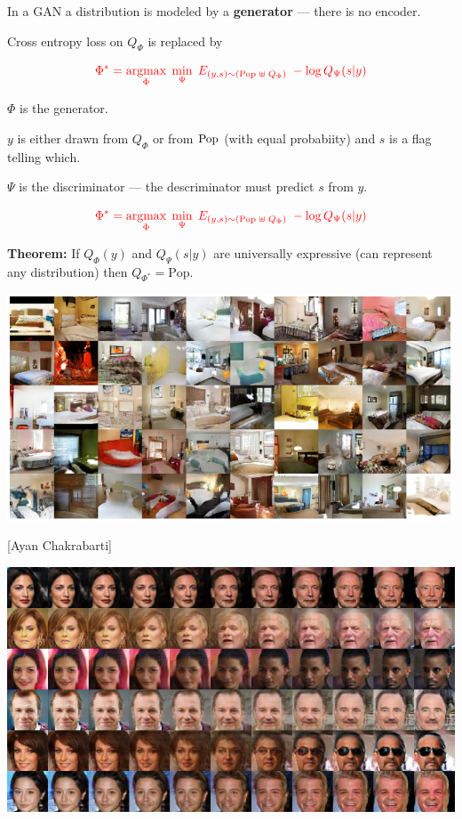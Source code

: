 {\bigskip
In a GAN a distribution is modeled by a {\bf generator} --- there is no encoder.


Cross entropy loss on $Q_\Phi$ is replaced by

$${\color{red} \Phi^* = \operatorname*{argmax}_\Phi \; \min_\Psi \;E_{(y,s) \sim (\mathrm{Pop}\; \uplus \;Q_\Phi)}\;-\log Q_\Psi(s|y)}$$

\vfill
$\Phi$ is the generator.

\vfill
$y$ is either drawn from $Q_\Phi$ or from $\mathrm{Pop}$ (with equal probabiity) and $s$ is a flag telling which.

\vfill
$\Psi$ is the discriminator --- the descriminator must predict $s$ from $y$.


$${\color{red} \Phi^* = \operatorname*{argmax}_\Phi \; \min_\Psi \;E_{(y,s) \sim (\mathrm{Pop}\; \uplus \;Q_\Phi)}\;-\log Q_\Psi(s|y)}$$

\vfill
{\bf Theorem:} If $Q_\Phi(y)$ and $Q_\Psi(s|y)$ are universally expressive (can represent any distribution) then
$Q_{\Phi^*} = \mathrm{Pop}.$


\centerline{\includegraphics[width = 10in]{../images/Bedrooms}}


[Ayan Chakrabarti]

\centerline{\includegraphics[width = 9in]{../images/interp}}

}
